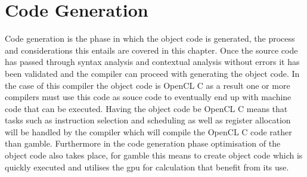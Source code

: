 \chapter{Code Generation}
Code generation is the phase in which the object code is generated, the process and considerations this entails are covered in this chapter.
Once the source code has passed through syntax analysis and contextual analysis without errors it has been validated and the compiler can proceed with generating the object code.
In the case of this compiler the object code is OpenCL C as a result one or more compilers must use this code as souce code to eventually end up with machine code that can be executed.
Having the object code be OpenCL C means that tasks such as instruction selection and scheduling as well as register allocation will be handled by the compiler which will compile the OpenCL C code rather than \gls{gamble}.
Furthermore in the code generation phase optimisation of the object code also takes place, for \gls{gamble} this means to create object code which is quickly executed and utilises the \acrshort{gpu} for calculation that benefit from its use.



